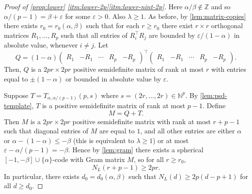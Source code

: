 \documentclass[reqno, 11pt]{amsart}
\theoremstyle{definition}
\theoremstyle{remark}
\newcommand{\NN}{\mathbb{N}}
\newcommand{\ZZ}{\mathbb{Z}}
\begin{document}
\begin{proof}[Proof of \cref{prop:lower} \ref{itm:lower-2p}\ref{itm:lower-nint-2p}]
Here $\alpha/\beta \notin \ZZ$ and so $\alpha/(p-1) = \beta + \varepsilon$ for some $\varepsilon > 0$. Also $\lambda \geq 1$. As before, by \cref{lem:matrix-copies} there exists $r_0=r_0(\alpha,\beta)$ such that for each $r \geq r_0$ there exist $r \times r$ orthogonal matrices $R_1, \ldots, R_p$ such that all entries of $R_i^\intercal R_j$ are bounded by $\varepsilon/(1-\alpha)$ in absolute value, whenever $i \neq j$. Let
\[
    Q = (1-\alpha) \begin{pmatrix}
					R_1& -R_1 & \cdots & R_p & -R_p
			      \end{pmatrix}^\intercal
                    \begin{pmatrix}
					R_1 & -R_1 & \cdots & R_p & -R_p
			      \end{pmatrix}.
\]
Then, $Q$ is a $2pr \times 2pr$ positive semidefinite matrix of rank at most $r$ with entries equal to $\pm (1-\alpha)$ or bounded in absolute value by $\varepsilon$.

Suppose $T = T_{\alpha, \alpha/(p-1)}(p,s)$ where $s = (2r, \ldots, 2r) \in \NN^p$. By \cref{lem:psd-template}, $T$ is a positive semidefinite matrix of rank at most $p-1$. Define
\[
    M = Q + T.
\]
Then $M$ is a $2pr \times 2pr$ positive semidefinite matrix with rank at most $r + p-1$ such that diagonal entries of $M$ are equal to $1$, and all other entries are either $\alpha$ or $\alpha - (1-\alpha) \leq -\beta$ (this is equivalent to $\lambda \geq 1$) or at most $\varepsilon - \alpha/(p-1) = -\beta$. Hence by \cref{lem:gram} there exists a spherical $[-1,-\beta] \cup \{\alpha\}$-code with Gram matrix $M$, so for all $r \geq r_0$,
\[
    N_L(r + p-1) \geq 2pr.
\]
In particular, there exists $d_0 = d_0(\alpha, \beta)$ such that $N_L(d) \geq 2p(d-p+1)$ for all $d \geq d_0$.
\end{proof}
\end{document}
